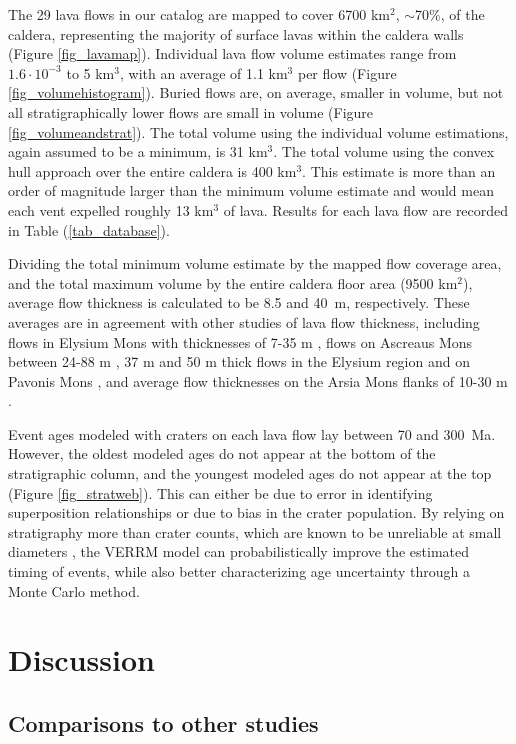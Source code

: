 \documentclass[12pt,letter]{article}
\begin{document}
The 29 lava flows in our catalog are mapped to cover 6700 km$^2$, $\sim$70\%, of the caldera, representing the majority of surface lavas within the caldera walls (Figure \ref{fig_lavamap}). Individual lava flow volume estimates range from $1.6\cdot 10^{-3}$ to 5 km$^3$, with an average of 1.1 km$^3$ per flow (Figure \ref{fig_volumehistogram}). Buried flows are, on average, smaller in volume, but not all stratigraphically lower flows are small in volume (Figure \ref{fig_volumeandstrat}). The total volume using the individual volume estimations, again assumed to be a minimum, is 31 km$^3$. The total volume using the convex hull approach over the entire caldera is 400 km$^3$. This estimate is more than an order of magnitude larger than the minimum volume estimate and would mean each vent expelled roughly 13 km$^3$ of lava. Results for each lava flow are recorded in Table (\ref{tab_database}).

Dividing the total minimum volume estimate by the mapped flow coverage area, and the total maximum volume by the entire caldera floor area (9500 km$^2$), average flow thickness is calculated to be 8.5 and 40~m, respectively. These averages are in agreement with other studies of lava flow thickness, including flows  in Elysium Mons with thicknesses of 7-35 m \citep{pasckert2012rheologies}, flows on Ascreaus Mons between 24-88 m \citep{hiesinger2007young}, 37 m and 50 m thick flows in the Elysium region and on Pavonis Mons \citep{glaze2003methodology,baloga2003rheology}, and average flow thicknesses on the Arsia Mons flanks of 10-30 m \citep{mouginis2008lava}.

Event ages modeled with craters on each lava flow lay between 70 and 300~Ma. However, the oldest modeled ages do not appear at the bottom of the stratigraphic column, and the youngest modeled ages do not appear at the top (Figure \ref{fig_stratweb}). This can either be due to error in identifying superposition relationships or due to bias in the crater population. By relying on stratigraphy more than crater counts, which are known to be unreliable at small diameters \citep[e.g.]{robbins2011volcanic,neukum2004recent}, the VERRM model can probabilistically improve the estimated timing of events, while also better characterizing age uncertainty through a Monte Carlo method.

\section{Discussion}

\subsection{Comparisons to other studies}
\end{document}
